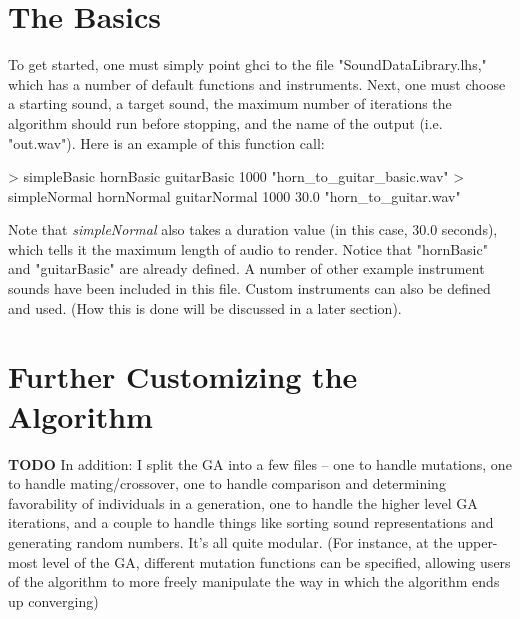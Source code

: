 \documentclass[11pt]{article}
\begin{document}
\section{The Basics}
To get started, one must simply point ghci to the file "SoundDataLibrary.lhs," which has a number of default functions and instruments.
Next, one must choose a starting sound, a target sound, the maximum number of iterations the algorithm should run before stopping, and the name of the output (i.e. "out.wav"). Here is an example of this function call:
\begin{code}
> simpleBasic hornBasic guitarBasic 1000 "horn_to_guitar_basic.wav"
> simpleNormal hornNormal guitarNormal 1000 30.0 "horn_to_guitar.wav"
\end{code}
Note that \emph{simpleNormal} also takes a duration value (in this case, 30.0 seconds), which tells it the maximum length of audio to render.
Notice that "hornBasic" and "guitarBasic" are already defined. A number of other example instrument sounds have been included in this file. Custom instruments can also be defined and used. (How this is done will be discussed in a later section).


\section{Further Customizing the Algorithm}
\textbf{TODO} In addition: I split the GA into a few files -- one to handle mutations, one to handle mating/crossover, one to handle comparison and determining favorability of individuals in a generation, one to handle the higher level GA iterations, and a couple to handle things like sorting sound representations and generating random numbers. It's all quite modular. (For instance, at the upper-most level of the GA, different mutation functions can be specified, allowing users of the algorithm to more freely manipulate the way in which the algorithm ends up converging)
\end{document}

